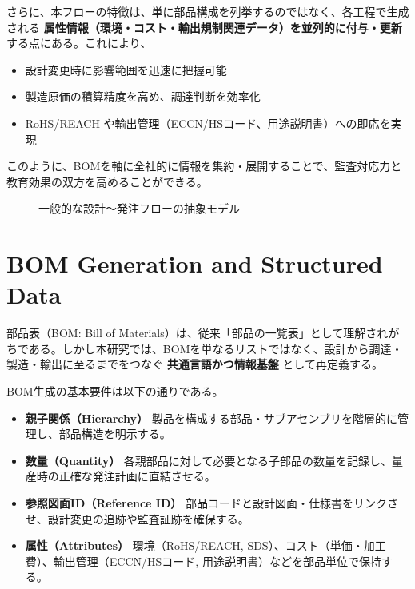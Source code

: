 \documentclass[10pt,conference]{IEEEtran}
\begin{document}
さらに、本フローの特徴は、単に部品構成を列挙するのではなく、各工程で生成される \textbf{属性情報（環境・コスト・輸出規制関連データ）を並列的に付与・更新} する点にある。これにより、
\begin{itemize}
  \item 設計変更時に影響範囲を迅速に把握可能
  \item 製造原価の積算精度を高め、調達判断を効率化
  \item RoHS/REACH や輸出管理（ECCN/HSコード、用途説明書）への即応を実現
\end{itemize}

このように、BOMを軸に全社的に情報を集約・展開することで、監査対応力と教育効果の双方を高めることができる。

\begin{figure}[t]
  \centering
  \caption{一般的な設計～発注フローの抽象モデル}
  \label{fig:workflow}
\end{figure}

\section{BOM Generation and Structured Data}
部品表（BOM: Bill of Materials）は、従来「部品の一覧表」として理解されがちである。しかし本研究では、BOMを単なるリストではなく、設計から調達・製造・輸出に至るまでをつなぐ \textbf{共通言語かつ情報基盤} として再定義する。

BOM生成の基本要件は以下の通りである。
\begin{itemize}
  \item \textbf{親子関係（Hierarchy）}  
  製品を構成する部品・サブアセンブリを階層的に管理し、部品構造を明示する。
  \item \textbf{数量（Quantity）}  
  各親部品に対して必要となる子部品の数量を記録し、量産時の正確な発注計画に直結させる。
  \item \textbf{参照図面ID（Reference ID）}  
  部品コードと設計図面・仕様書をリンクさせ、設計変更の追跡や監査証跡を確保する。
  \item \textbf{属性（Attributes）}  
  環境（RoHS/REACH, SDS）、コスト（単価・加工費）、輸出管理（ECCN/HSコード, 用途説明書）などを部品単位で保持する。
\end{itemize}
\end{document}
